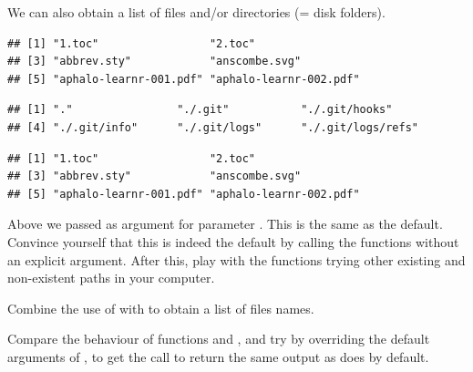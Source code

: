 \documentclass[krantz2,ChapterTOCs]{krantz}\usepackage{knitr}
\begin{document}
We can also obtain a list of files and/or directories (= disk folders).
\begin{knitrout}\footnotesize
{}\color{fgcolor}\begin{kframe}
\begin{alltt}
\hlstd{(}\hlstd{(}\hlstd{))}
\end{alltt}
\begin{verbatim}
## [1] "1.toc"                 "2.toc"                
## [3] "abbrev.sty"            "anscombe.svg"         
## [5] "aphalo-learnr-001.pdf" "aphalo-learnr-002.pdf"
\end{verbatim}
\begin{alltt}
\hlstd{(}\hlstd{(}\hlstd{))}
\end{alltt}
\begin{verbatim}
## [1] "."                "./.git"           "./.git/hooks"    
## [4] "./.git/info"      "./.git/logs"      "./.git/logs/refs"
\end{verbatim}
\begin{alltt}
\hlstd{(}\hlstd{(}\hlstd{))}
\end{alltt}
\begin{verbatim}
## [1] "1.toc"                 "2.toc"                
## [3] "abbrev.sty"            "anscombe.svg"         
## [5] "aphalo-learnr-001.pdf" "aphalo-learnr-002.pdf"
\end{verbatim}
\end{kframe}
\end{knitrout}

\begin{playground}
Above we passed  as argument for parameter . This is the same as the default. Convince yourself that this is indeed the default by calling the functions without an explicit argument. After this, play with the functions trying other existing and non-existent paths in your computer.
\end{playground}

\begin{playground}
Combine the use of  with  to obtain a list of files names.
\end{playground}

\begin{playground}
Compare the behaviour of functions  and , and try by overriding the default arguments of , to get the call to return the same output as  does by default.
\end{playground}
\end{document}
